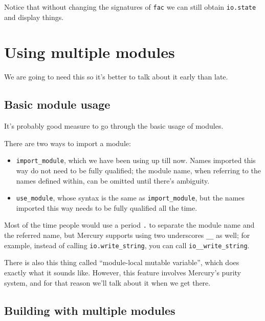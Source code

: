 Notice that without changing the signatures of \texttt{fac} we can still obtain \texttt{io.state} and display things.


\section{Using multiple modules}

We are going to need this so it's better to talk about it early than late.

\subsection{Basic module usage}

It's probably good measure to go through the basic usage of modules.

There are two ways to import a module:

\begin{itemize}
\item \texttt{import\_module}, which we have been using up till now. Names imported this way do not need to be fully qualified; the module name, when referring to the names defined within, can be omitted until there's ambiguity.
\item \texttt{use\_module}, whose syntax is the same as \texttt{import\_module}, but the names imported this way needs to be fully qualified all the time.
\end{itemize}

Most of the time people would use a period \texttt{.} to separate the module name and the referred name, but Mercury supports using two underscores \texttt{\_\_} as well; for example, instead of calling \texttt{io.write\_string}, you can call \texttt{io\_\_write\_string}.

There is also this thing called ``module-local mutable variable'', which does exactly what it sounds like. However, this feature involves Mercury's purity system, and for that reason we'll talk about it when we get there.


\subsection{Building with multiple modules}

